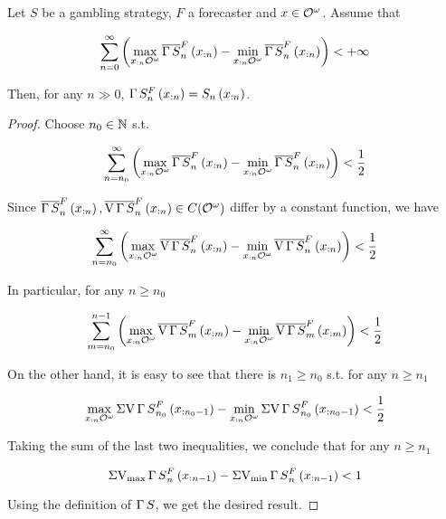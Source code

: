 \begin{samepage}
\begin{proposition}
\label{prp:when_bounded_play}

Let $S$ be a gambling strategy, $F$ a forecaster and $x \in \mathcal{O}^\omega$. Assume that

\begin{equation}
\sum_{n=0}^\infty {\left(\max_{x_{:n}\mathcal{O}^\omega} \overline{\operatorname{\Gamma}{S}}^F_n\left(x_{:n}\right)-\min_{x_{:n}\mathcal{O}^\omega} \overline{\operatorname{\Gamma}{S}}^F_n\left(x_{:n}\right)\right)} < +\infty
\end{equation}

Then, for any $n \gg 0$, $\operatorname{\Gamma}{S}^F_n\left(x_{:n}\right)=S_n\left(x_{:n}\right)$.

\end{proposition}
\end{samepage}

\begin{proof}

Choose $n_0 \in \mathbb{N}$ s.t. 

$$\sum_{n=n_0}^\infty {\left(\max_{x_{:n}\mathcal{O}^\omega} \overline{\operatorname{\Gamma}{S}}^F_n\left(x_{:n}\right)-\min_{x_{:n}\mathcal{O}^\omega} \overline{\operatorname{\Gamma}{S}}^F_n\left(x_{:n}\right)\right)} < \frac{1}{2}$$

Since $\overline{\operatorname{\Gamma}{S}}^F_n\left(x_{:n}\right), \overline{\operatorname{V}{\operatorname{\Gamma}{S}}}^F_n\left(x_{:n}\right) \in C(\mathcal{O}^\omega)$ differ by a constant function, we have

$$\sum_{n=n_0}^\infty {\left(\max_{x_{:n}\mathcal{O}^\omega} \overline{\operatorname{V}{\operatorname{\Gamma}{S}}}^F_n\left(x_{:n}\right)-\min_{x_{:n}\mathcal{O}^\omega} \overline{\operatorname{V}{\operatorname{\Gamma}{S}}}^F_n\left(x_{:n}\right)\right)} < \frac{1}{2}$$

In particular, for any $n \geq n_0$

$$\sum_{m=n_0}^{n-1} {\left(\max_{x_{:n}\mathcal{O}^\omega} \overline{\operatorname{V}{\operatorname{\Gamma}{S}}}^F_m\left(x_{:m}\right)-\min_{x_{:n}\mathcal{O}^\omega} \overline{\operatorname{V}{\operatorname{\Gamma}{S}}}^F_m\left(x_{:m}\right)\right)} < \frac{1}{2}$$

On the other hand, it is easy to see that there is $n_1 \geq n_0$ s.t. for any $n \geq n_1$

$$\max_{x_{:n}\mathcal{O}^\omega} \operatorname{\Sigma V}{\operatorname{\Gamma}{S}}_{n_0}^F\left(x_{:n_0 - 1}\right) - \min_{x_{:n}\mathcal{O}^\omega} \operatorname{\Sigma V}{\operatorname{\Gamma}{S}}_{n_0}^F\left(x_{:n_0 - 1}\right) < \frac{1}{2}$$

Taking the sum of the last two inequalities, we conclude that for any $n \geq n_1$

$$\operatorname{\Sigma V_{\max}}{\operatorname{\Gamma}{S}}_{n}^F\left(x_{:n-1}\right) - \operatorname{\Sigma V_{\min}}{\operatorname{\Gamma}{S}}_{n}^F\left(x_{:n-1}\right) < 1$$

Using the definition of $\operatorname{\Gamma}{S}$, we get the desired result.
\end{proof}

